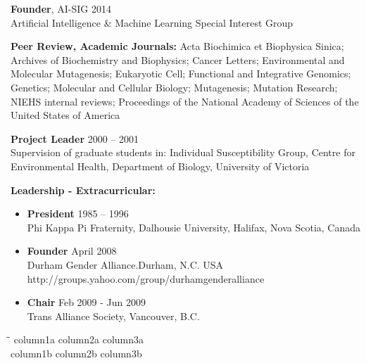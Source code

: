 \documentclass[margin]{res} %
\begin{document}
\begin{resume}
\textbf{Founder}, AI-SIG \hfill 2014\vspace{0.2 cm}\\
Artificial Intelligence \& Machine Learning Special Interest Group

\textbf{Peer Review, Academic Journals:} Acta Biochimica et Biophysica Sinica; Archives of Biochemistry and Biophysics; Cancer Letters; Environmental and Molecular Mutagenesis; Eukaryotic Cell; Functional and Integrative Genomics; Genetics; Molecular and Cellular Biology; Mutagenesis; Mutation Research; NIEHS internal reviews; Proceedings of the National Academy of Sciences of the United States of America

\textbf{Project Leader} \hfill 2000 – 2001\vspace{0.2 cm}\\
Supervision of graduate students in: Individual Susceptibility Group, Centre for Environmental Health, Department of Biology, University of Victoria

\textbf{Leadership - Extracurricular:}
\vspace{-\baselineskip} \vspace{0.2 cm}\\

\begin{itemize} \itemsep -2pt %
\item
\textbf{President} \hfill 1985 – 1996 \vspace{0.05 cm}\\
Phi Kappa Pi Fraternity, Dalhousie University, Halifax, Nova Scotia, Canada \vspace{0.2 cm}
\item \textbf{Founder} \hfill April 2008 \vspace{0.05 cm}\\
Durham Gender Alliance.Durham, N.C. USA\vspace{0.05 cm}\\
http://groups.yahoo.com/group/durhamgenderalliance \vspace{0.2 cm}
\item \textbf{Chair} \hfill Feb 2009 - Jun 2009\vspace{0.05 cm}\\
Trans Alliance Society, Vancouver, B.C.
\end{itemize}

\iffalse
\begin{tabbing}
\hspace*{2cm}\=\hspace*{3cm}\= \kill
column1a \> column2a \> column3a \\
column1b \> column2b \> column3b 
\end{tabbing}


\end{resume}
\end{document}
